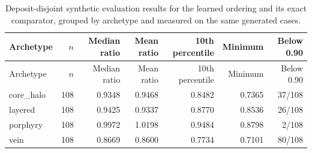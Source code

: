 \begin{longtable}{lrrrrrr}
\caption{Deposit-disjoint synthetic evaluation results for the learned ordering and its exact comparator, grouped by archetype and measured on the same generated cases.}\label{tab:learned-by-archetype}\\
\toprule Archetype & $n$ & Median ratio & Mean ratio & 10th percentile & Minimum & Below 0.90 \\ \midrule
\endfirsthead\toprule Archetype & $n$ & Median ratio & Mean ratio & 10th percentile & Minimum & Below 0.90 \\ \midrule\endhead
core\_halo & 108 & 0.9348 & 0.9468 & 0.8482 & 0.7365 & 37/108 \\
layered & 108 & 0.9425 & 0.9337 & 0.8770 & 0.8536 & 26/108 \\
porphyry & 108 & 0.9972 & 1.0198 & 0.9484 & 0.8798 & 2/108 \\
vein & 108 & 0.8669 & 0.8600 & 0.7734 & 0.7101 & 80/108 \\
\bottomrule\end{longtable}
